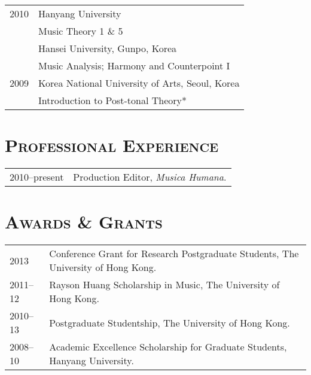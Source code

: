 \documentclass[a4paper,11pt,draft]{article}
\begin{document}
\begin{tabular}{p{2.5cm} l}
    2010 & Hanyang University\\
    & Music Theory 1 \& 5\\[1mm]
    
    & Hansei University, Gunpo, Korea\\
    & Music Analysis; Harmony and Counterpoint I\\[1mm]
    
    2009 & Korea National University of Arts, Seoul, Korea\\
    & Introduction to Post-tonal Theory*\\
  \end{tabular}
  
  \vspace{2.5mm}
  
  \section*{\textsc{Professional Experience}}
  
  \hspace*{-0.25cm}
  \begin{tabular}{p{2.5cm} l}
    2010--present & Production Editor, \textit{Musica Humana}.
  \end{tabular}
  
  
  \section*{\textsc{Awards \& Grants}}
  
  \hspace*{-0.25cm}
  \begin{tabular}{p{2.5cm} l}
    2013 & Conference Grant for Research Postgraduate Students, The University
    of Hong Kong.\\
    
    2011–12 & Rayson Huang Scholarship in Music, The University of Hong Kong.\\
    
    2010–13 & Postgraduate Studentship, The University of Hong Kong.\\
    
    2008–10 & Academic Excellence Scholarship for Graduate Students, Hanyang
    University.
  \end{tabular}
  
  \vspace{2.5mm}
  
\end{document}
